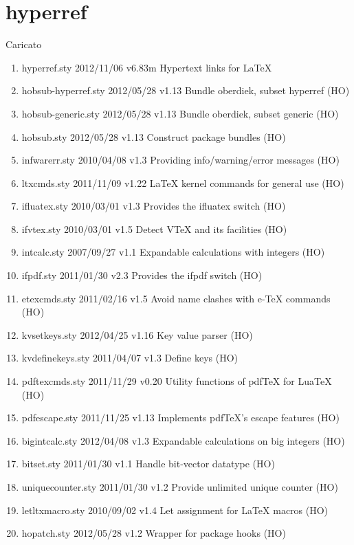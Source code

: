 \section{hyperref}  


Caricato 
\begin{enumerate}
\item 	hyperref.sty    2012/11/06 v6.83m Hypertext links for LaTeX
\item 	hobsub-hyperref.sty    2012/05/28 v1.13 Bundle oberdiek, subset hyperref (HO)
\item 	hobsub-generic.sty    2012/05/28 v1.13 Bundle oberdiek, subset generic (HO)
\item 	hobsub.sty    2012/05/28 v1.13 Construct package bundles (HO)
\item 	infwarerr.sty    2010/04/08 v1.3 Providing info/warning/error messages (HO)
\item 	ltxcmds.sty    2011/11/09 v1.22 LaTeX kernel commands for general use (HO)
\item 	ifluatex.sty    2010/03/01 v1.3 Provides the ifluatex switch (HO)
\item 	ifvtex.sty    2010/03/01 v1.5 Detect VTeX and its facilities (HO)
\item 	intcalc.sty    2007/09/27 v1.1 Expandable calculations with integers (HO)
\item 	ifpdf.sty    2011/01/30 v2.3 Provides the ifpdf switch (HO)
\item 	etexcmds.sty    2011/02/16 v1.5 Avoid name clashes with e-TeX commands (HO)
\item 	kvsetkeys.sty    2012/04/25 v1.16 Key value parser (HO)
\item 	kvdefinekeys.sty    2011/04/07 v1.3 Define keys (HO)
\item 	pdftexcmds.sty    2011/11/29 v0.20 Utility functions of pdfTeX for LuaTeX (HO)
\item 	pdfescape.sty    2011/11/25 v1.13 Implements pdfTeX's escape features (HO)
\item 	bigintcalc.sty    2012/04/08 v1.3 Expandable calculations on big integers (HO)
\item 	bitset.sty    2011/01/30 v1.1 Handle bit-vector datatype (HO)
\item 	uniquecounter.sty    2011/01/30 v1.2 Provide unlimited unique counter (HO)
\item 	letltxmacro.sty    2010/09/02 v1.4 Let assignment for LaTeX macros (HO)
\item 	hopatch.sty    2012/05/28 v1.2 Wrapper for package hooks (HO)

\end{enumerate}
